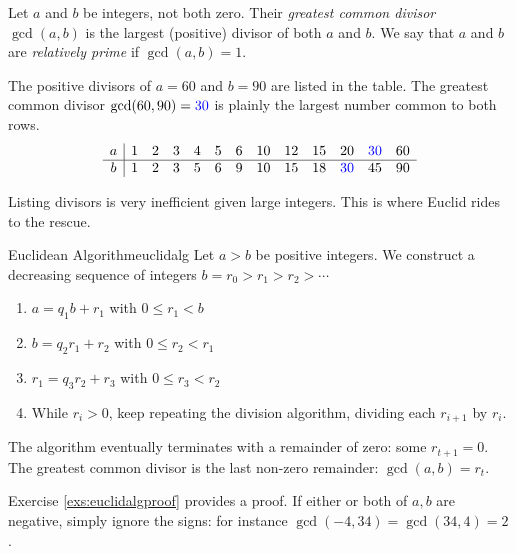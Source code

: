 \begin{defn}{}{}
	Let $a$ and $b$ be integers, not both zero. Their \emph{greatest common divisor} $\gcd(a,b)$ is the largest (positive) divisor of both $a$ and $b$. We say that $a$ and $b$ are \emph{relatively prime} if $\gcd(a,b)=1$.
\end{defn}

\begin{example}{}{}
	The positive divisors of $a=60$ and $b=90$ are listed in the table. The greatest common divisor $\gcd(60,90)=\textcolor{blue}{30}$ is plainly the largest number common to both rows.
	\[
		\begin{array}{c|cccccccccccc}
			a&1&2&3&4&5&6&10&12&15&20&\textcolor{blue}{30}&60\\\hline
			b&1&2&3&5&6&9&10&15&18&\textcolor{blue}{30}&45&90
		\end{array}
	\]
\end{example}

Listing divisors is very inefficient given large integers. This is where Euclid rides to the rescue.

\begin{thm}{Euclidean Algorithm}{euclidalg}
	Let $a>b$ be positive integers. We construct a decreasing sequence of integers $b=r_0>r_1>r_2>\cdots$
	\begin{enumerate}\itemsep1pt
		\item {}$a=q_1b+r_1$ with $0\le r_1<b$
		\item {}$b=q_2r_1+r_2$ with $0\le r_2<r_1$
		\item {}$r_1=q_3r_2+r_3$ with $0\le r_3<r_2$
		\item While $r_i>0$, keep repeating the division algorithm, dividing each $r_{i+1}$ by $r_i$.
	\end{enumerate}
	The algorithm eventually terminates with a remainder of zero: some $r_{t+1}=0$. The greatest common divisor is the last non-zero remainder: $\gcd(a,b)=r_t$.
\end{thm}

Exercise \ref{exs:euclidalgproof} provides a proof. If either or both of $a,b$ are negative, simply ignore the signs: for instance $\gcd(-4,34)=\gcd(34,4)=2$.

